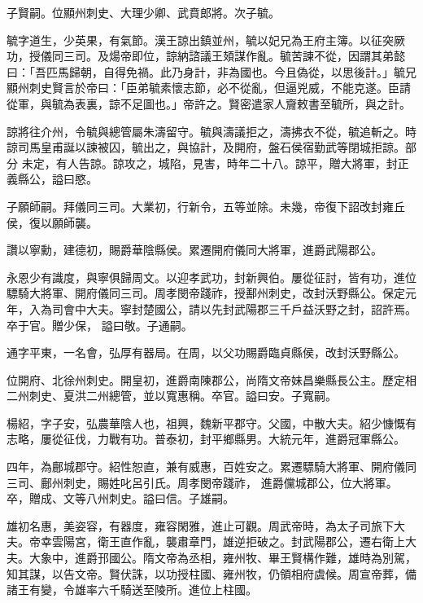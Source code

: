 \begin{pinyinscope}
 子賢嗣。位顯州刺史、大理少卿、武賁郎將。次子毓。



 毓字道生，少英果，有氣節。漢王諒出鎮並州，毓以妃兄為王府主簿。以征突厥功，授儀同三司。及煬帝即位，諒納諮議王頍謀作亂。毓苦諫不從，因謂其弟懿曰：「吾匹馬歸朝，自得免禍。此乃身計，非為國也。今且偽從，以思後計。」毓兄顯州刺史賢言於帝曰：「臣弟毓素懷志節，必不從亂，但逼兇威，不能克遂。臣請從軍，與毓為表裏，諒不足圖也。」帝許之。賢密遣家人齎敕書至毓所，與之計。



 諒將往介州，令毓與總管屬朱濤留守。毓與濤議拒之，濤拂衣不從，毓追斬之。時諒司馬皇甫誕以諫被囚，毓出之，與協計，及開府，盤石侯宿勤武等閉城拒諒。部分
 未定，有人告諒。諒攻之，城陷，見害，時年二十八。諒平，贈大將軍，封正義縣公，謚曰愍。



 子願師嗣。拜儀同三司。大業初，行新令，五等並除。未幾，帝復下詔改封雍丘侯，復以願師襲。



 讚以寧勳，建德初，賜爵華陰縣侯。累遷開府儀同大將軍，進爵武陽郡公。



 永恩少有識度，與寧俱歸周文。以迎孝武功，封新興伯。屢從征討，皆有功，進位驃騎大將軍、開府儀同三司。周孝閔帝踐祚，授鄯州刺史，改封沃野縣公。保定元年，入為司會中大夫。寧封楚國公，請以先封武陽郡三千戶益沃野之封，詔許焉。卒于官。贈少保，
 謚曰敬。子通嗣。



 通字平東，一名會，弘厚有器局。在周，以父功賜爵臨貞縣侯，改封沃野縣公。



 位開府、北徐州刺史。開皇初，進爵南陳郡公，尚隋文帝妹昌樂縣長公主。歷定相二州刺史、夏洪二州總管，並以寬惠稱。卒官。謚曰安。子寬嗣。



 楊紹，字子安，弘農華陰人也，祖興，魏新平郡守。父國，中散大夫。紹少慷慨有志略，屢從征伐，力戰有功。普泰初，封平鄉縣男。大統元年，進爵冠軍縣公。



 四年，為鄜城郡守。紹性恕直，兼有威惠，百姓安之。累遷驃騎大將軍、開府儀同三司、鄜州刺史，賜姓叱呂引氏。周孝閔帝踐祚，
 進爵儻城郡公，位大將軍。卒，贈成、文等八州刺史。謚曰信。子雄嗣。



 雄初名惠，美姿容，有器度，雍容閑雅，進止可觀。周武帝時，為太子司旅下大夫。帝幸雲陽宮，衛王直作亂，襲肅章門，雄逆拒破之。封武陽郡公，遷右衛上大夫。大象中，進爵邘國公。隋文帝為丞相，雍州牧、畢王賢構作難，雄時為別駕，知其謀，以告文帝。賢伏誅，以功授柱國、雍州牧，仍領相府虞候。周宣帝葬，備諸王有變，令雄率六千騎送至陵所。進位上柱國。




\end{pinyinscope}
